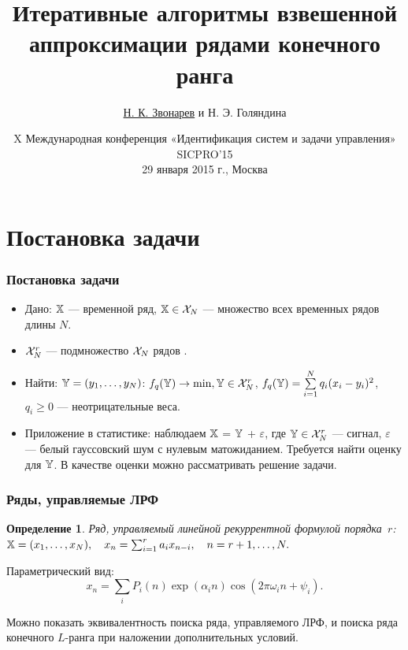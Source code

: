 \documentclass[unicode, notheorems]{beamer}
\title{Итеративные алгоритмы взвешенной аппроксимации рядами конечного ранга}
\author{\underline{Н. К. Звонарев} и Н. Э. Голяндина}
\institute[СПбГУ]{Санкт-Петербургский государственный университет \\
}
\date{
	X Международная конференция «Идентификация систем и задачи управления» SICPRO’15 \\
    29 января 2015 г., Москва
}
\newtheorem{definition}{Определение}
\begin{document}
\begin{frame}
    \titlepage
\end{frame}

\section{Постановка задачи}

\begin{frame}
    \frametitle{Постановка задачи}
    \begin{itemize}
    \item Дано: $\mathbb{X}$ --- временной ряд, $\mathbb{X} \in \mathcal{X}_N$ --- множество всех временных рядов длины $N$.
    \item $\mathcal{X}_N^r$ --- подмножество $\mathcal{X}_N$ рядов .
    \item Найти: $\mathbb{Y} = (y_1, \ldots, y_N)$: $f_q(\mathbb{Y}) \to \min, \mathbb{Y} \in \mathcal{X}_N^r$, $f_q(\mathbb{Y}) = \sum \limits_{i=1}^N q_i(x_i - y_i)^2$, $q_i \ge 0$ --- неотрицательные веса.
    \item Приложение в статистике: наблюдаем $\mathbb{X}$ = $\mathbb{Y}$ + $\varepsilon$, где $\mathbb{Y} \in \mathcal{X}_N^r$ --- сигнал, $\varepsilon$ --- белый гауссовский шум с нулевым матожиданием. Требуется найти оценку для $\mathbb{Y}$. В качестве оценки можно рассматривать решение задачи.
    \end{itemize}

\end{frame}

\begin{frame}
	\frametitle{Ряды, управляемые ЛРФ}
	\begin{definition}
		Ряд, управляемый линейной рекуррентной формулой порядка~$r$: $\mathbb{X} = (x_1, \ldots, x_N), \quad x_n = \sum_{i = 1}^{r} a_i x_{n-i}, \quad n = r + 1, \ldots, N.$
	\end{definition}
	Параметрический вид:
	\begin{equation*}
	x_n = \sum_i P_i(n) \exp(\alpha_i n) \cos(2 \pi \omega_i n + \psi_i).
	\end{equation*}
	
	Можно показать эквивалентность поиска ряда, управляемого ЛРФ, и поиска ряда конечного $L$-ранга при наложении дополнительных условий.
\end{frame}
\end{document}
